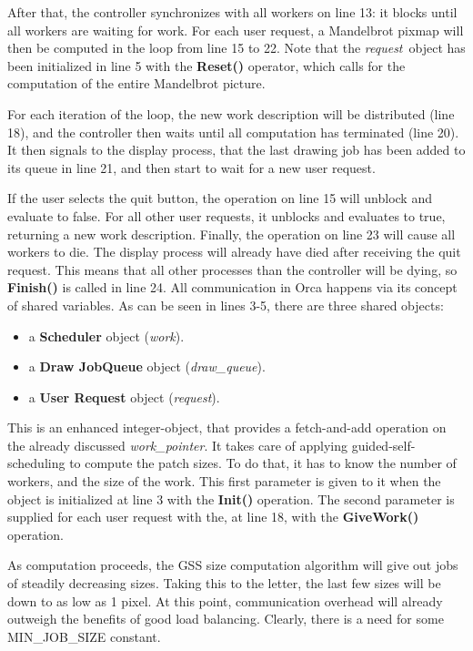 After that, the controller synchronizes with all workers on line 13: it blocks
until all workers are waiting for work.
\Skip
For each user request, a Mandelbrot pixmap will then be computed in the loop
from line 15 to 22. Note that the {\em request}\ object has been initialized
in line 5 with the {\bf Reset()} operator, which calls for the computation
of the entire Mandelbrot picture. 

For each iteration of the loop, the new work description will be distributed 
(line 18), and the controller then waits until all computation has terminated 
(line 20). It then signals to the display process, that the last drawing job 
has been added to its queue in line 21, and then start to wait for a new user 
request.

If the user selects the quit button, the operation on line 15 will unblock
and evaluate to false. For all other user requests, it unblocks and
evaluates to true, returning a new work description. 
\Skip
Finally, the operation on line 23 will cause all workers to die. The display
process will already have died after receiving the quit request.
This means that all other processes than the controller will be dying, so
{\bf Finish()} is called in line 24.
\Skip
All communication in Orca happens via its concept of shared variables.
As can be seen in lines 3-5, there are three shared objects:
\begin{itemize}
\item a {\bf Scheduler} object ({\em work}). 
\item a {\bf Draw JobQueue} object ({\em draw\_queue}).  
\item a {\bf User Request} object ({\em request}).
\end{itemize}

 \label{label:scheduler}

This is an enhanced integer-object, that provides a fetch-and-add operation 
on the already discussed {\em work\_pointer}.  It takes care of applying 
guided-self-scheduling to compute the patch sizes. To do that, it has to know 
the number of workers, and the size of the work. This first parameter is given
to it when the object is initialized at line 3 with the {\bf Init()} operation.
The second parameter is supplied for each user request with the, at line 18, 
with the {\bf GiveWork()} operation.

As computation proceeds, the GSS size computation algorithm will give out
jobs of steadily decreasing sizes. Taking this to the letter, the last few
sizes will be down to as low as 1 pixel. At this point, communication overhead
will already outweigh the benefits of good load balancing. Clearly,
there is a need for some MIN\_JOB\_SIZE constant. 

